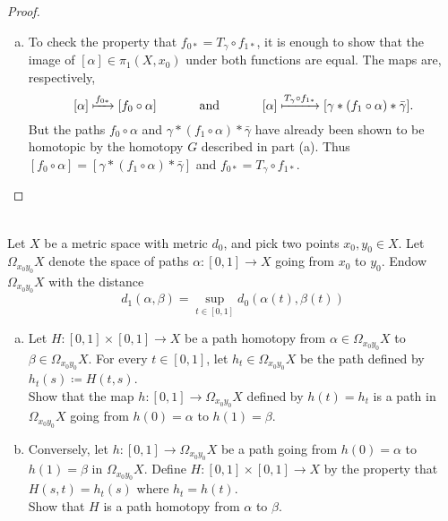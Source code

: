 \documentclass{article}
\newenvironment{problem}[2][Problem]{\begin{trivlist}
\item[\hskip \labelsep {\bfseries #1}\hskip \labelsep {\bfseries #2.}]}{\end{trivlist}}
\begin{document}
\begin{proof}
\begin{enumerate}[(a)]
\begin{enumerate}[(i)]
    \end{enumerate}
    \item To check the property that $f_{0*} = T_\gamma \circ f_{1*}$, it is
    enough to show that the image of $[\alpha] \in \pi_1(X, x_0)$ under both
    functions are equal. The maps are, respectively, \[
      [\alpha] \xmapsto{f_{0*}} [f_0 \circ \alpha]
      \hspace{1.2cm}\text{and}\hspace{1.2cm}
      [\alpha] \xmapsto{T_\gamma \circ f_{1*}} [\gamma * (f_1 \circ \alpha) * \bar\gamma].
    \]
    But the paths $f_0 \circ \alpha$ and $\gamma * (f_1 \circ \alpha) * \bar\gamma$
    have already been shown to be homotopic by the homotopy $G$ described in part
    (a). Thus $[f_0 \circ \alpha] = [\gamma * (f_1 \circ \alpha) * \bar\gamma]$
    and $f_{0*} = T_\gamma \circ f_{1*}$.
  \end{enumerate}
\end{proof}
\pagebreak
\begin{problem}{2} \text{} \\
  Let $X$ be a metric space with metric $d_0$, and pick two points
  $x_0, y_0 \in X$. Let $\Omega_{x_0y_0}X$ denote the space of paths
  $\alpha\colon[0,1]\rightarrow X$ going from $x_0$ to $y_0$. Endow
  $\Omega_{x_0y_0}X$ with the distance \[
    d_1(\alpha, \beta) = \sup_{t\in[0,1]} d_0(\alpha(t), \beta(t))
  \]
  \begin{enumerate}[a.]
    \item Let $H\colon[0,1]\times[0,1]\rightarrow X$ be a path homotopy from
    $\alpha \in \Omega_{x_0y_0}X$ to $\beta \in \Omega_{x_0y_0}X$. For every
    $t \in [0,1]$, let $h_t \in \Omega_{x_0y_0}X$ be the path defined by
    $h_t(s) \coloneqq H(t, s)$.
    \\
    Show that the map $h\colon[0,1]\rightarrow\Omega_{x_0y_0}X$ defined by
    $h(t) = h_t$ is a path in  $\Omega_{x_0y_0}X$ going from $h(0) = \alpha$ to
    $ h(1) = \beta$.
    \item Conversely, let $h\colon[0,1]\rightarrow\Omega_{x_0y_0}X$ be a path going
    from $h(0)=\alpha$ to $h(1)=\beta$ in $\Omega_{x_0y_0}X$. Define
    $H\colon[0,1]\times[0,1]\rightarrow X$ by the property that $H(s,t)=h_t(s)$
    where $h_t = h(t)$.
    \\
    Show that $H$ is a path homotopy from $\alpha$ to $\beta$.
  \end{enumerate}
\end{problem}
\end{document}
